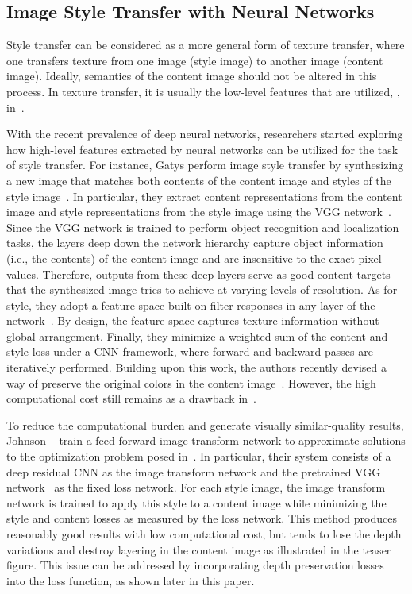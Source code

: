 \documentclass[10pt,twocolumn,letterpaper]{article}
\begin{document}
\subsection{Image Style Transfer with Neural Networks}

Style transfer can be considered as a more general form of texture transfer, where one transfers texture from one image (style image) to another image (content image). Ideally, semantics of the content image should not be altered in this process. In texture transfer, it is usually the low-level features that are utilized, \eg, in~\cite{efros2001image}.

With the recent prevalence of deep neural networks, researchers started exploring how high-level features extracted by neural networks can be utilized for the task of style transfer. For instance, Gatys \etal perform image style transfer by synthesizing a new image that matches both contents of the content image and styles of the style image~\cite{gatys2016image}. In particular, they extract content representations from the content image and style representations from the style image using the VGG network~\cite{simonyan2014very}. Since the VGG network is trained to perform object recognition and localization tasks, the layers deep down the network hierarchy capture object information (i.e., the contents) of the content image and are insensitive to the exact pixel values. Therefore, outputs from these deep layers serve as good content targets that the synthesized image tries to achieve at varying levels of resolution. As for style, they adopt a feature space built on filter responses in any layer of the network~\cite{gatys2015texture}. By design, the feature space captures texture information without global arrangement. Finally, they minimize a weighted sum of the content and style loss under a CNN framework, where forward and backward passes are iteratively performed. Building upon this work, the authors recently devised a way of preserve the original colors in the content image~\cite{gatys2016preserving}. However, the high computational cost still remains as a drawback in~\cite{gatys2016image}.

To reduce the computational burden and generate visually similar-quality results, Johnson \etal~\cite{johnson2016perceptual} train a feed-forward image transform network to approximate solutions to the optimization problem posed in~\cite{gatys2016image}. In particular, their system consists of a deep residual CNN as the image transform network and the pretrained VGG network~\cite{simonyan2014very} as the fixed loss network. For each style image, the image transform network is trained to apply this style to a content image while minimizing the style and content losses as measured by the loss network. This method produces reasonably good results with low computational cost, but tends to lose the depth variations and destroy layering in the content image as illustrated in the teaser figure. This issue can be addressed by incorporating depth preservation losses into the loss function, as shown later in this paper.
\end{document}
